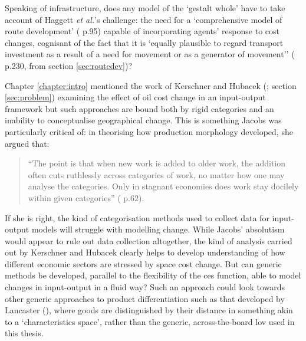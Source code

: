 Speaking of infrastructure, does any model of the `gestalt whole' have to take account of Haggett \emph{et al.}'s challenge: the need for a `comprehensive model of route development' (\citealt{haggett_locational_1977} p.95) capable of incorporating agents' response to cost changes, cognisant of the fact that it is `equally plausible to regard transport investment as a result of a need for movement or as a generator of movement'' (\citealt{chapman_people_1979} p.230, from section \ref{sec:routedev})? 

Chapter \ref{chapter:intro} mentioned the work of Kerschner and Hubacek (\citeyear{kerschner_assessing_2009}; section \ref{sec:problem}) examining the effect of oil cost change in an input-output framework but such approaches are bound both by rigid categories and an inability to conceptualise geographical change. This is something Jacobs was particularly critical of: in theorising how production morphology developed, she argued that:

\begin{quote}
``The point is that when new work is added to older work, the addition often cuts ruthlessly across categories of work, no matter how one may analyse the categories. Only in stagnant economies does work stay docilely within given categories'' (\citealt{jacobs_economy_1970} p.62).
\end{quote}

If she is right, the kind of categorisation methods used to collect data for input-output models will struggle with modelling change. While Jacobs' absolutism would appear to rule out data collection altogether, the kind of analysis carried out by Kerschner and Hubacek clearly helps to develop understanding of how different economic sectors are stressed by space cost change. But can generic methods be developed, parallel to the flexibility of the \gls{ces} function, able to model changes in input-output in a fluid way? Such an approach could look towards other generic approaches to product differentiation such as that developed by Lancaster (\citeyear{lancaster_socially_1975}), where goods are distinguished by their distance in something akin to a `characteristics space', rather than the generic, across-the-board \gls{lov} used in this thesis.

